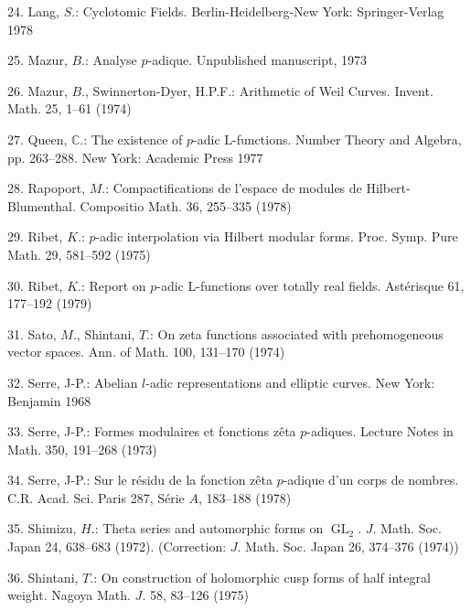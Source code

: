 \documentclass[11pt]{article}
\begin{document}
24. Lang, \(S\).: Cyclotomic Fields. Berlin-Heidelberg-New York: Springer-Verlag 1978\par
\par
25. Mazur, \(B\).: Analyse \(p\)-adique. Unpublished manuscript, 1973\par
\par
26. Mazur, \(B\)., Swinnerton-Dyer, H.P.F.: Arithmetic of Weil Curves. Invent. Math. 25, 1--61 (1974)\par
\par
27. Queen, \(\mathbb{C}\).: The existence of \(p\)-adic L-functions. Number Theory and Algebra, pp. 263--288. New York: Academic Press 1977\par
\par
28. Rapoport, \(M\).: Compactifications de l’espace de modules de Hilbert-Blumenthal. Compositio Math. 36, 255--335 (1978)\par
\par
29. Ribet, \(K\).: \(p\)-adic interpolation via Hilbert modular forms. Proc. Symp. Pure Math. 29, 581--592 (1975)\par
\par
30. Ribet, \(K\).: Report on \(p\)-adic L-functions over totally real fields. Astérisque 61, 177--192 (1979)\par
\par
31. Sato, \(M\)., Shintani, \(T\).: On zeta functions associated with prehomogeneous vector spaces. Ann. of Math. 100, 131--170 (1974)\par
\par
32. Serre, J-P.: Abelian \(l\)-adic representations and elliptic curves. New York: Benjamin 1968\par
\par
33. Serre, J-P.: Formes modulaires et fonctions zêta \(p\)-adiques. Lecture Notes in Math. 350, 191--268 (1973)\par
\par
34. Serre, J-P.: Sur le résidu de la fonction zêta \(p\)-adique d’un corps de nombres. C.R. Acad. Sci. Paris 287, Série \(A\), 183--188 (1978)\par
\par
35. Shimizu, \(H\).: Theta series and automorphic forms on \(\operatorname{GL}_{2}\). \(J\). Math. Soc. Japan 24, 638--683 (1972). (Correction: \(J\). Math. Soc. Japan 26, 374--376 (1974))\par
\par
36. Shintani, \(T\).: On construction of holomorphic cusp forms of half integral weight. Nagoya Math. \(J\). 58, 83--126 (1975)\par
\end{document}
